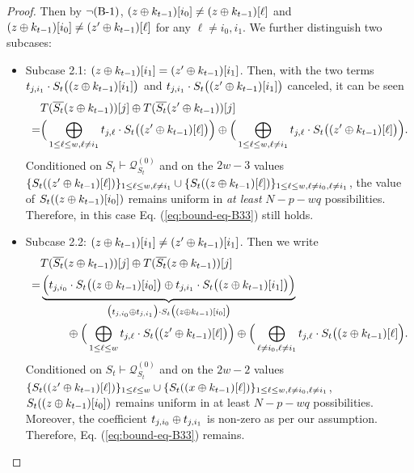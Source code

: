 \begin{proof}
Then by $\neg\text{(B-1)}$, $(z\oplus k_{t-1})[i_0]\neq(z\oplus k_{t-1})[\ell]$ and $(z\oplus k_{t-1})[i_0]\neq(z'\oplus k_{t-1})[\ell]$ for any $\ell\neq i_0,i_1$. We further distinguish two subcases:
\begin{itemize}
	\item Subcase 2.1: $(z\oplus k_{t-1})[i_1]=(z'\oplus k_{t-1})[i_1]$. Then, with the two terms $t_{j,i_1}\cdot S_t\big((z\oplus k_{t-1})[i_1]\big)$ and $t_{j,i_1}\cdot S_t\big((z'\oplus k_{t-1})[i_1]\big)$ canceled, it can be seen
	\begin{align*}
	&  T(\overline{S_t}(z\oplus k_{t-1}))[j]\oplus T(\overline{S_t}(z'\oplus k_{t-1}))[j]       \\
	= &
	\Big(\bigoplus_{1\leq\ell\leq w,\ell\neq i_1}t_{j,\ell}\cdot S_t\big((z'\oplus k_{t-1})[\ell]\big)\Big)\oplus
	\Big(\bigoplus_{1\leq\ell\leq w,\ell\neq i_1}t_{j,\ell}\cdot S_t\big((z'\oplus k_{t-1})[\ell]\big)\Big)   .
	\end{align*}
	Conditioned on $S_t\vdash\mathcal{Q}_{S_t}^{(0)}$ and on the $2w-3$ values $\{S_t((z'\oplus k_{t-1})[\ell])\}_{1\leq \ell\leq w,\ell\neq i_1}\cup\{S_t((z\oplus k_{t-1})[\ell])\}_{1\leq \ell\leq w,\ell\neq i_0,\ell\neq i_1}$, the value of $S_t((z\oplus k_{t-1})[i_0])$ remains uniform in {\it at least} $N-p-wq$ possibilities. Therefore, in this case Eq. (\ref{eq:bound-eq-B33}) still holds.
	\item Subcase 2.2: $(z\oplus k_{t-1})[i_1]\neq(z'\oplus k_{t-1})[i_1]$. Then we write
	\begin{align*}
	&  T(\overline{S_t}(z\oplus k_{t-1}))[j]\oplus T(\overline{S_t}(z\oplus k_{t-1}))[j]       \\
	= &   \underbrace{\Big(t_{j,i_0}\cdot S_t\big((z\oplus k_{t-1})[i_0]\big)
		\oplus
		t_{j,i_1}\cdot S_t\big((z\oplus k_{t-1})[i_1]\big)\Big)}_{\big(t_{j,i_0}\oplus t_{j,i_1}\big)\cdot S_t\big((z\oplus k_{t-1})[i_0]\big)}   	\\
	&\ \ \ \ \ \ \ \oplus
	\Big(\bigoplus_{1\leq\ell\leq w}t_{j,\ell}\cdot S_t\big((z'\oplus k_{t-1})[\ell]\big)\Big)    \oplus
	\Big(\bigoplus_{\ell\neq i_0,\ell\neq i_1}t_{j,\ell}\cdot S_t\big((z\oplus k_{t-1})[\ell]\Big).
	\end{align*}
	Conditioned on $S_t\vdash\mathcal{Q}_{S_t}^{(0)}$ and on the $2w-2$ values $\{S_t((z'\oplus k_{t-1})[\ell])\}_{1\leq \ell\leq w}\cup\{S_t((x\oplus k_{t-1})[\ell])\}_{1\leq \ell\leq w,\ell\neq i_0,\ell\neq i_1}$, $S_t((z\oplus k_{t-1})[i_0])$ remains uniform in at least $N-p-wq$ possibilities. Moreover, the coefficient $t_{j,i_0}\oplus t_{j,i_1}$ is non-zero as per our assumption. Therefore, Eq. (\ref{eq:bound-eq-B33}) remains.
\end{itemize}





\end{proof}
